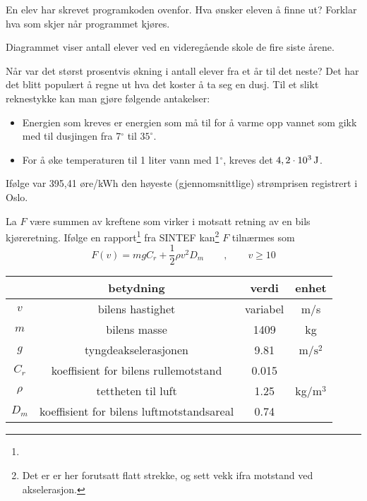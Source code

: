 




En elev har skrevet programkoden ovenfor.
Hva ønsker eleven å finne ut?
Forklar hva som skjer når programmet kjøres.

Diagrammet viser antall elever ved en videregående skole de fire siste årene.\os

Når var det størst prosentvis økning i antall elever fra et år til det neste?
\newpage		
{}
Det har det blitt populært å regne ut hva det koster å ta seg en dusj. Til et slikt reknestykke kan man gjøre følgende antakelser:
\begin{itemize}
	\item Energien som kreves er energien som må til for å varme opp vannet som gikk med til dusjingen fra 7$^\circ $ til $ 35^\circ $.
	\item For å øke temperaturen til 1 liter vann med 1$ ^\circ $, kreves det $ 4,2\cdot10^3\,\textrm{J} $.
\end{itemize}
Ifølge  var 395,41 øre/kWh den høyeste (gjennomsnittlige) strømprisen registrert i Oslo. 

\newpage
{}

La $ F $ være summen av kreftene som virker i motsatt retning av en bils kjøreretning. Ifølge en rapport\footnote{} fra SINTEF kan\footnote{Det er er her forutsatt flatt strekke, og sett vekk ifra motstand ved akselerasjon.} $ F $ tilnærmes som
\[ F(v)= mgC_r+\frac{1}{2}\rho v^2 D_m\qquad,\qquad v\geq10\]
\begin{center}
	\begin{tabular}{c|c|c|c}
		& \textbf{betydning} & \textbf{verdi}&\textbf{enhet}  \\ \hline
		$ v $ & bilens hastighet & variabel& m/s \\
		$ m $& bilens masse\footnotemark & 1409 & kg\\
		$ g $& tyngdeakselerasjonen & 9.81 & m/$ \text{s}^2 $ \\
		$ C_r $ & koeffisient for bilens rullemotstand & 0.015\\
		$ \rho $ & tettheten til luft & 1.25 & kg/$ \text{m}^3 $ \\
		$ D_m $& koeffisient for bilens luftmotstandsareal\footnotemark &0.74
	\end{tabular}
\end{center}

